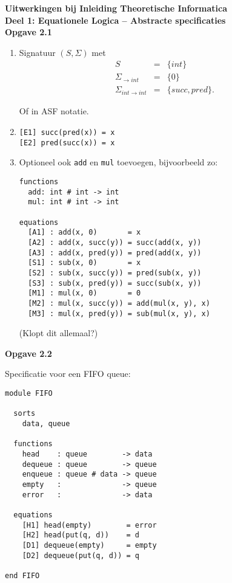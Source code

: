 \documentclass[a4paper,11pt]{article}
\begin{document}
{\bf Uitwerkingen bij Inleiding Theoretische Informatica\\
Deel 1: Equationele Logica -- Abstracte specificaties}\\[2em]


{\bf Opgave 2.1}

\begin{enumerate}

\item %
Signatuur $(S, \Sigma)$ met
\begin{eqnarray*}
S & = & \{int\} \\
\Sigma_{\rightarrow int} & = & \{0\} \\
\Sigma_{int \rightarrow int} & = & \{succ, pred\}.
\end{eqnarray*}

Of in ASF notatie.

\item %
\begin{verbatim}
[E1] succ(pred(x)) = x
[E2] pred(succ(x)) = x
\end{verbatim}

\item %
Optioneel ook \verb|add| en \verb|mul| toevoegen, bijvoorbeeld zo:

\begin{verbatim}
functions
  add: int # int -> int
  mul: int # int -> int

equations
  [A1] : add(x, 0)       = x
  [A2] : add(x, succ(y)) = succ(add(x, y))
  [A3] : add(x, pred(y)) = pred(add(x, y))
  [S1] : sub(x, 0)       = x
  [S2] : sub(x, succ(y)) = pred(sub(x, y))
  [S3] : sub(x, pred(y)) = succ(sub(x, y))
  [M1] : mul(x, 0)       = 0
  [M2] : mul(x, succ(y)) = add(mul(x, y), x)
  [M3] : mul(x, pred(y)) = sub(mul(x, y), x)
\end{verbatim}

(Klopt dit allemaal?)

\end{enumerate}


{\bf Opgave 2.2} %

Specificatie voor een FIFO queue:

\begin{verbatim}
module FIFO

  sorts
    data, queue

  functions
    head    : queue        -> data
    dequeue : queue        -> queue
    enqueue : queue # data -> queue
    empty   :              -> queue
    error   :              -> data

  equations
    [H1] head(empty)        = error
    [H2] head(put(q, d))    = d
    [D1] dequeue(empty)     = empty
    [D2] dequeue(put(q, d)) = q

end FIFO
\end{verbatim}
\end{document}

